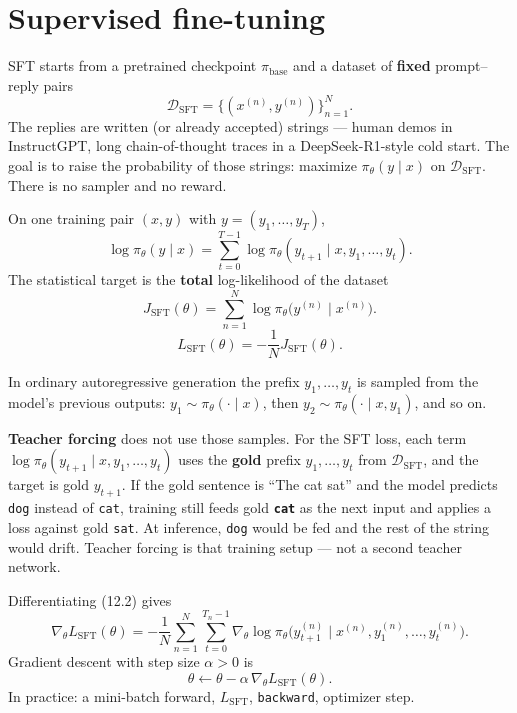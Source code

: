 \section{Supervised fine-tuning}

SFT starts from a pretrained checkpoint $\pi_{\mathrm{base}}$ and a dataset of \textbf{fixed} prompt--reply pairs \[
\mathcal{D}_{\mathrm{SFT}}=\bigl\{(x^{(n)}, y^{(n)})\bigr\}_{n=1}^{N}.
\] The replies are written (or already accepted) strings --- human demos in InstructGPT, long chain-of-thought traces in a DeepSeek-R1-style cold start. The goal is to raise the probability of those strings: maximize $\pi_\theta(y\mid x)$ on $\mathcal{D}_{\mathrm{SFT}}$. There is no sampler and no reward.

On one training pair $(x,y)$ with $y=(y_1,\ldots,y_T)$, \[
\log\pi_\theta(y\mid x)
=
\sum_{t=0}^{T-1}
\log\pi_\theta(y_{t+1}\mid x, y_1,\ldots,y_t).
\] The statistical target is the \textbf{total} log-likelihood of the dataset \begin{equation}
J_{\mathrm{SFT}}(\theta)
=
\sum_{n=1}^{N}
\log\pi_\theta\bigl(y^{(n)}\mid x^{(n)}\bigr).
\tag{12.1}
\end{equation} \begin{equation}
L_{\mathrm{SFT}}(\theta)
=
-\frac1N J_{\mathrm{SFT}}(\theta).
\tag{12.2}
\end{equation}

In ordinary autoregressive generation the prefix $y_1,\ldots,y_t$ is sampled from the model's previous outputs: $y_1\sim\pi_\theta(\cdot\mid x)$, then $y_2\sim\pi_\theta(\cdot\mid x,y_1)$, and so on.

\textbf{Teacher forcing} does not use those samples. For the SFT loss, each term $\log\pi_\theta(y_{t+1}\mid x, y_1,\ldots,y_t)$ uses the \textbf{gold} prefix $y_1,\ldots,y_t$ from $\mathcal{D}_{\mathrm{SFT}}$, and the target is gold $y_{t+1}$. If the gold sentence is ``The cat sat'' and the model predicts \texttt{dog} instead of \texttt{cat}, training still feeds gold \textbf{\texttt{cat}} as the next input and applies a loss against gold \texttt{sat}. At inference, \texttt{dog} would be fed and the rest of the string would drift. Teacher forcing is that training setup --- not a second teacher network.

Differentiating (12.2) gives \begin{equation}
\nabla_\theta L_{\mathrm{SFT}}(\theta)
=
-\frac1N\sum_{n=1}^{N}
\sum_{t=0}^{T_n-1}
\nabla_\theta\log\pi_\theta\bigl(y^{(n)}_{t+1}\mid x^{(n)}, y^{(n)}_1,\ldots,y^{(n)}_t\bigr).
\tag{12.3}
\end{equation} Gradient descent with step size $\alpha>0$ is \begin{equation}
\theta\leftarrow\theta-\alpha\,\nabla_\theta L_{\mathrm{SFT}}(\theta).
\tag{12.4}
\end{equation} In practice: a mini-batch forward, $L_{\mathrm{SFT}}$, \texttt{backward}, optimizer step.

